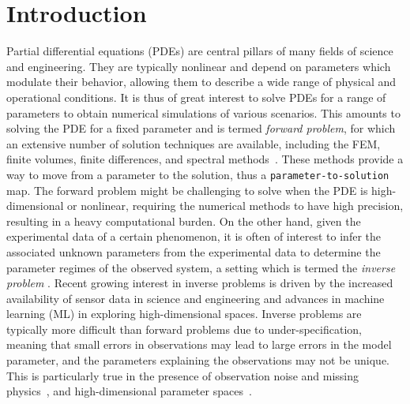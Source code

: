 \documentclass[11pt, fleqn]{article}
\begin{document}
\section{Introduction}
%
Partial differential equations (PDEs) are central pillars of many fields of science and engineering. They are typically nonlinear and depend on parameters which modulate their behavior, allowing them to describe a wide range of physical and operational conditions. It is thus of great interest to solve PDEs for a range of parameters to obtain numerical simulations of various scenarios. This amounts to solving the PDE for a fixed parameter and is termed \textit{forward problem}, for which an extensive number of solution techniques are available, including the \gls*{FEM}, finite volumes, finite differences, and spectral methods~\cite{ern2004theory, quarteroni2008numerical}. These methods provide a way to move from a parameter to the solution, thus a \texttt{parameter-to-solution} map. The forward problem might be challenging to solve when the PDE is high-dimensional or nonlinear, requiring the numerical methods to have high precision, resulting in a heavy computational burden. On the other hand, given the experimental data of a certain phenomenon, it is often of interest to infer the associated unknown parameters from the experimental data to determine the parameter regimes of the observed system, a setting which is termed the \textit{inverse problem} \cite{tarantola2005inverse}. Recent growing interest in inverse problems is driven by the increased availability of sensor data in science and engineering and advances in machine learning (ML) in exploring high-dimensional spaces. Inverse problems are typically more difficult than forward problems due to under-specification, meaning that small errors in observations may lead to large errors in the model parameter, and the parameters explaining the observations may not be unique. This is particularly true in the presence of observation noise and missing physics~\cite{stuart_2010}, and high-dimensional parameter spaces~\cite{vogel2002computational, arridge_maass_oktem_schonlieb_2019}. 
\end{document}
